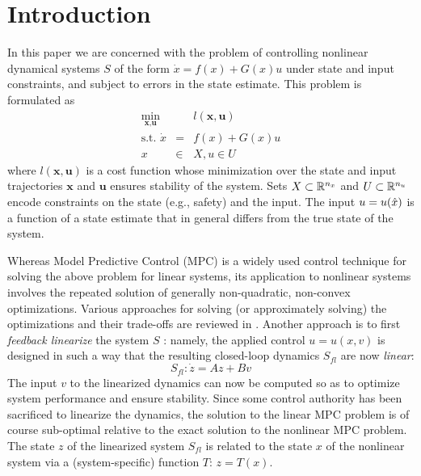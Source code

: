 \section{Introduction}
\label{sec:intro}

In this paper we are concerned with the problem of controlling nonlinear dynamical systems $S$ of the form $\dot{x} = f(x) + G(x)u$ under state and input constraints, and subject to errors in the state estimate.
This problem is formulated as
\begin{eqnarray}
	\label{eq:generic NLMPC}
	\min_{\textbf{x},\textbf{u}} &\;& l(\textbf{x}, \textbf{u}) \\
	\text{s.t. } \dot{x}&=&f(x) + G(x)u \nonumber \\
	x&\in& X, u \in U  \nonumber
\end{eqnarray}
where $l(\textbf{x}, \textbf{u})$ is a cost function whose minimization over the state and input trajectories $\textbf{x}$ and $\textbf{u}$ ensures stability of the system. 
Sets $X \subset \mathbb{R}^{n_x}$ and $ U \subset \mathbb{R}^{n_u}$ encode constraints on the state (e.g., safety) and the input.
The input $u = u(\hat{x})$ is a function of a state estimate that in general differs from the true state of the system.

Whereas Model Predictive Control (MPC) is a widely used control technique for solving the above problem for linear systems, its application to nonlinear systems involves the repeated solution of generally non-quadratic, non-convex optimizations.
Various approaches for solving (or approximately solving) the optimizations and their trade-offs are reviewed in \cite{Cannon04_EfficientMPC}.
Another approach is to first \emph{feedback linearize} the system $S$ \cite{khalil}: namely, the applied control $u = u(x,v)$ is designed in such a way that the resulting closed-loop dynamics $S_{fl}$ are now \emph{linear}:
	\[S_{fl}: \dot{z} = Az + Bv\]
The input $v$ to the linearized dynamics can now be computed so as to optimize system performance and ensure stability.
Since some control authority has been sacrificed to linearize the dynamics, the solution to the linear MPC problem is of course sub-optimal relative to the exact solution to the nonlinear MPC problem.
The state $z$ of the linearized system $S_{fl}$ is related to the state $x$ of the nonlinear system via a (system-specific) function $T$: $z=T(x)$.

